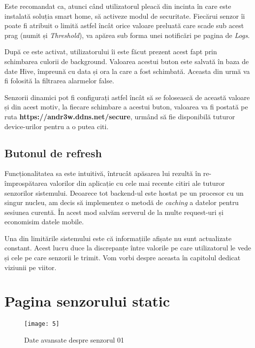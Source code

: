 Este recomandat ca, atunci când utilizatorul pleacă din incinta în care este instalată soluția smart home, să activeze modul de securitate. Fiecărui senzor îi poate fi atribuit o limită astfel încât orice valoare preluată  care scade sub acest prag (numit și \emph{Threshold}), va apărea sub forma unei notificări pe pagina de \emph{Logs}.

După ce este activat, utilizatorului îi este făcut prezent acest fapt prin schimbarea culorii de background. Valoarea acestui buton este salvată în baza de date Hive, împreună cu data și ora la care a fost schimbată. Aceasta din urmă va fi folosită la filtrarea alarmelor false.

Senzorii dinamici pot fi configurați astfel încât să se folosească de această valoare și din acest motiv, la fiecare schimbare a acestui buton, valoarea va fi postată pe ruta \textbf{https://andr3w.ddns.net/secure}, urmând să fie disponibilă tuturor device-urilor pentru a o putea citi.

\subsection{Butonul de refresh}

Funcționalitatea sa este intuitivă, întrucât apăsarea lui rezultă în re-împrospătarea valorilor din aplicație cu cele mai recente citiri ale tuturor senzorilor sistemului. Deoarece tot backend-ul este hostat pe un procesor cu un singur nucleu, am decis să implementez o metodă de \emph{caching} a datelor pentru sesiunea curentă. În acest mod salvăm serverul de la multe request-uri și economisim datele mobile.

Una din limitările sistemului este că informațiile afișate nu sunt actualizate constant. Acest lucru duce la discrepanțe între valorile pe care utilizatorul le vede și cele pe care senzorii le trimit. Vom vorbi despre aceasta în capitolul dedicat viziunii pe viitor.

\break

\section{Pagina senzorului static}
\label{section:static}

\begin{wrapfigure}{r}{0.3\textwidth}
	\texttt{[image: 5]}
	\caption{Date avansate despre senzorul 01}
	\label{fig:5}
\end{wrapfigure}

